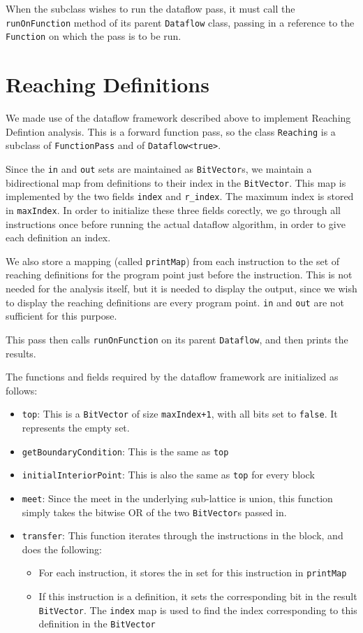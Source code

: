 \documentclass[12pt]{article}
\begin{document}
When the subclass wishes to run the dataflow pass, it must call the \verb|runOnFunction| method of its parent \verb|Dataflow| class, passing in a reference to the \verb|Function| on which the pass is to be run.

\section{Reaching Definitions}
We made use of the dataflow framework described above to implement Reaching Defintion analysis. This is a forward function pass, so the class \verb|Reaching| is a subclass of \verb|FunctionPass| and of \verb|Dataflow<true>|.

Since the \verb|in| and \verb|out| sets are maintained as \verb|BitVector|s, we maintain a bidirectional map from definitions to their index in the \verb|BitVector|. This map is implemented by the two fields \verb|index| and \verb|r_index|. The maximum index is stored in \verb|maxIndex|. In order to initialize these three fields corectly, we go through all instructions once before running the actual dataflow algorithm, in order to give each definition an index.

We also store a mapping (called \verb|printMap|) from each instruction to the set of reaching definitions for the program point just before the instruction. This is not needed for the analysis itself, but it is needed to display the output, since we wish to display the reaching definitions are every program point. \verb|in| and \verb|out| are not sufficient for this purpose.

This pass then calls \verb|runOnFunction| on its parent \verb|Dataflow|, and then prints the results.

The functions and fields required by the dataflow framework are initialized as follows:
\begin{itemize}
\item \verb|top|: This is a \verb|BitVector| of size \verb|maxIndex+1|, with all bits set to \verb|false|. It represents the empty set.
\item \verb|getBoundaryCondition|: This is the same as \verb|top|
\item \verb|initialInteriorPoint|: This is also the same as \verb|top| for every block
\item \verb|meet|: Since the meet in the underlying sub-lattice is union, this function simply takes the bitwise OR of the two \verb|BitVector|s passed in.
\item \verb|transfer|: This function iterates through the instructions in the block, and does the following:
\begin{itemize}
  \item For each instruction, it stores the in set for this instruction in \verb|printMap|
  \item If this instruction is a definition, it sets the corresponding bit in the result \verb|BitVector|. The \verb|index| map is used to find the index corresponding to this definition in the \verb|BitVector|
\end{itemize}
\end{itemize}
\end{document}
